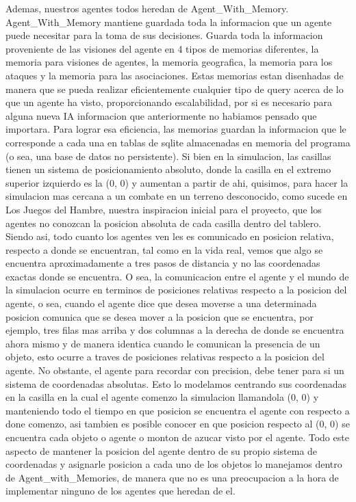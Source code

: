 \documentclass[11pt]{article}
\begin{document}
Ademas, nuestros agentes todos heredan de Agent_With_Memory. Agent_With_Memory mantiene guardada toda la informacion que un agente puede necesitar para la toma de sus decisiones. Guarda toda la informacion proveniente de las visiones del agente en 4 tipos de memorias diferentes, la memoria para visiones de agentes, la memoria geografica, la memoria para los ataques y la memoria para las asociaciones. Estas memorias estan disenhadas de manera que se pueda realizar eficientemente cualquier tipo de query acerca de lo que un agente ha visto, proporcionando escalabilidad, por si es necesario para alguna nueva IA informacion que anteriormente no habiamos pensado que importara. Para lograr esa eficiencia, las memorias guardan la informacion que le corresponde a cada una en tablas de sqlite almacenadas en memoria del programa (o sea, una base de datos no persistente).
Si bien en la simulacion, las casillas tienen un sistema de posicionamiento absoluto, donde la casilla en el extremo superior izquierdo es la (0, 0) y aumentan a partir de ahi, quisimos, para hacer la simulacion mas cercana a un combate en un terreno desconocido, como sucede en Los Juegos del Hambre, nuestra inspiracion inicial para el proyecto, que los agentes no conozcan la posicion absoluta de cada casilla dentro del tablero. Siendo asi, todo cuanto los agentes ven les es comunicado en posicion relativa, respecto a donde se encuentran, tal como en la vida real, vemos que algo se encuentra aproximadamente a tres pasos de distancia y no las coordenadas exactas donde se encuentra.
O sea, la comunicacion entre el agente y el mundo de la simulacion ocurre en terminos de posiciones relativas respecto a la posicion del agente, o sea, cuando el agente dice que desea moverse a una determinada posicion comunica que se desea mover a la posicion que se encuentra, por ejemplo, tres filas mas arriba y dos columnas a la derecha de donde se encuentra ahora mismo y de manera identica cuando le comunican la presencia de un objeto, esto ocurre a traves de posiciones relativas respecto a la posicion del agente.
No obstante, el agente para recordar con precision, debe tener para si un sistema de coordenadas absolutas. Esto lo modelamos centrando sus coordenadas en la casilla en la cual el agente comenzo la simulacion llamandola (0, 0) y manteniendo todo el tiempo en que posicion se encuentra el agente con respecto a done comenzo, asi tambien es posible conocer en que posicion respecto al (0, 0) se encuentra cada objeto o agente o monton de azucar visto por el agente. Todo este aspecto de mantener la posicion del agente dentro de su propio sistema de coordenadas y asignarle posicion a cada uno de los objetos lo manejamos dentro de Agent_with_Memories, de manera que no es una preocupacion a la hora de implementar ninguno de los agentes que heredan de el.
\end{document}

